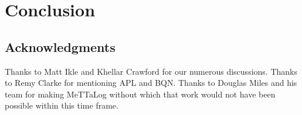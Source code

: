 \documentclass[]{report}
\begin{document}
\chapter{Conclusion}

\section{Acknowledgments}
Thanks to Matt Ikle and Khellar Crawford for our numerous discussions.
Thanks to Remy Clarke for mentioning APL and BQN.  Thanks to Douglas
Miles and his team for making MeTTaLog without which that work would
not have been possible within this time frame.


 
\end{document}
